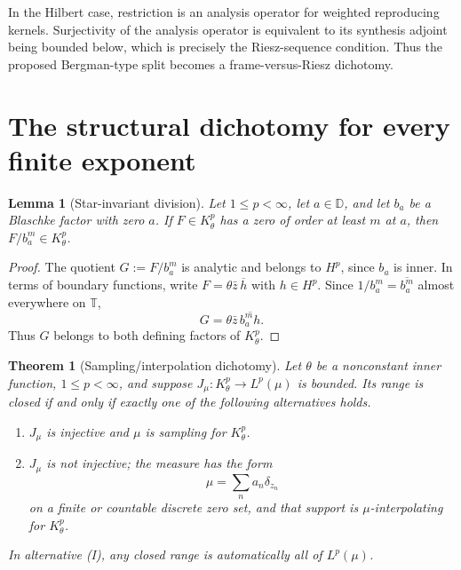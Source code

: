 \documentclass[10pt]{article}
\newtheorem{theorem}{Theorem}
\newtheorem{lemma}{Lemma}
\newcommand{\D}{\mathbb D}
\newcommand{\T}{\mathbb T}
\begin{document}
In the Hilbert case, restriction is an analysis operator for weighted
reproducing kernels.  Surjectivity of the analysis operator is equivalent to
its synthesis adjoint being bounded below, which is precisely the
Riesz-sequence condition.  Thus the proposed Bergman-type split becomes a
frame-versus-Riesz dichotomy.

\section{The structural dichotomy for every finite exponent}

\begin{lemma}[Star-invariant division]\label{lem:division}
Let $1\le p<\infty$, let $a\in\D$, and let $b_a$ be a Blaschke factor with
zero $a$.  If $F\in K_\theta^p$ has a zero of order at least $m$ at $a$, then
$F/b_a^m\in K_\theta^p$.
\end{lemma}

\begin{proof}
The quotient $G:=F/b_a^m$ is analytic and belongs to $H^p$, since $b_a$ is
inner.  In terms of boundary functions, write
$F=\theta\bar z\,\overline h$ with $h\in H^p$.  Since
$1/b_a^m=\overline{b_a^m}$ almost everywhere on $\T$,
\[
 G=\theta\bar z\,\overline{b_a^m h}.
\]
Thus $G$ belongs to both defining factors of $K_\theta^p$.
\end{proof}

\begin{theorem}[Sampling/interpolation dichotomy]\label{thm:allp}
Let $\theta$ be a nonconstant inner function, $1\le p<\infty$, and suppose
$J_\mu:K_\theta^p\to L^p(\mu)$ is bounded.  Its range is closed if and only
if exactly one of the following alternatives holds.
\begin{enumerate}
\item[(S)] $J_\mu$ is injective and $\mu$ is sampling for $K_\theta^p$.
\item[(I)] $J_\mu$ is not injective; the measure has the form
\[
 \mu=\sum_n a_n\delta_{z_n}
\]
on a finite or countable discrete zero set, and that support is
$\mu$-interpolating for $K_\theta^p$.
\end{enumerate}
In alternative \emph{(I)}, any closed range is automatically all of
$L^p(\mu)$.
\end{theorem}
\end{document}

